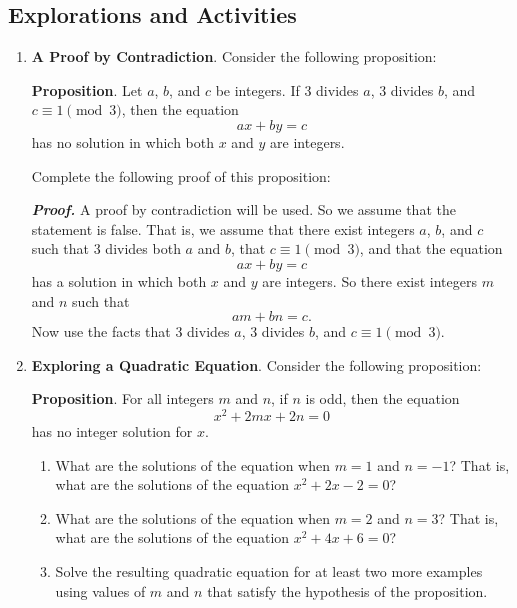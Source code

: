 \subsection*{Explorations and Activities}
\setcounter{oldenumi}{\theenumi}
\begin{enumerate} \setcounter{enumi}{\theoldenumi}
\item  \textbf{A Proof by Contradiction}.   Consider the following proposition:

\noindent
\textbf{Proposition}. Let  $a$, $b$, and $c$  be integers.  If  3  divides  $a$,  3  divides  $b$,  and  $c \equiv 1 \pmod 3$, then the equation	
\[
ax + by = c
\]
has no solution in which both  $x$  and  $y$  are integers.

\newpar
Complete the following proof of this proposition:

\noindent
\textbf{\emph{Proof.}}  A proof by contradiction will be used.  So we assume that the statement is false.  That is, we assume that there exist integers $a$, $b$, and $c$ such that 3  divides both  $a$  and  $b$, that  $c \equiv 1 \pmod 3$,  and that  the equation
\[
ax + by = c
\]
has a solution in which both  $x$  and  $y$  are integers.
So there exist integers  $m$  and  $n$  such that 
\[
am  + bn  = c.
\]
\hint  Now use the facts that  3  divides  $a$, 3  divides  $b$, and  
$c \equiv 1 \pmod 3$.


\item \textbf{Exploring a Quadratic Equation}.  Consider the following proposition:

\noindent
\textbf{Proposition}. For all integers $m$ and $n$, if $n$ is odd, then the equation
   \[
   x^2+2mx+2n=0
   \]
   has no integer solution for $x$.

\begin{enumerate}
  \item What are the solutions of the equation  when  $m = 1$ and $n =  - 1$?  That is, what are the solutions of the equation  $x^2  + 2x - 2 = 0$?

  \item What are the solutions of the equation  when  $m = 2$ and $n = 3$?  That is, what are the solutions of the equation  $x^2  + 4x + 6 = 0$?


  \item Solve the resulting quadratic equation for at least two more examples using values of  
$m$  and  $n$  that satisfy the hypothesis of the proposition.


\end{enumerate}
\end{enumerate}
